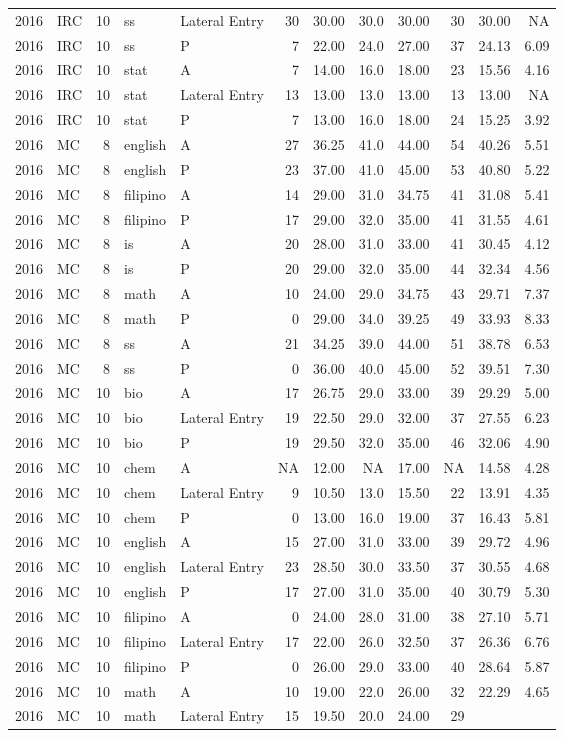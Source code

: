 \documentclass[]{article}
\begin{document}
\begin{longtable}[]{@{}rlrllrrrrrrr@{}}
2016 & IRC & 10 & ss & Lateral Entry & 30 & 30.00 & 30.0 & 30.00 & 30 &
30.00 & NA\tabularnewline
2016 & IRC & 10 & ss & P & 7 & 22.00 & 24.0 & 27.00 & 37 & 24.13 &
6.09\tabularnewline
2016 & IRC & 10 & stat & A & 7 & 14.00 & 16.0 & 18.00 & 23 & 15.56 &
4.16\tabularnewline
2016 & IRC & 10 & stat & Lateral Entry & 13 & 13.00 & 13.0 & 13.00 & 13
& 13.00 & NA\tabularnewline
2016 & IRC & 10 & stat & P & 7 & 13.00 & 16.0 & 18.00 & 24 & 15.25 &
3.92\tabularnewline
2016 & MC & 8 & english & A & 27 & 36.25 & 41.0 & 44.00 & 54 & 40.26 &
5.51\tabularnewline
2016 & MC & 8 & english & P & 23 & 37.00 & 41.0 & 45.00 & 53 & 40.80 &
5.22\tabularnewline
2016 & MC & 8 & filipino & A & 14 & 29.00 & 31.0 & 34.75 & 41 & 31.08 &
5.41\tabularnewline
2016 & MC & 8 & filipino & P & 17 & 29.00 & 32.0 & 35.00 & 41 & 31.55 &
4.61\tabularnewline
2016 & MC & 8 & is & A & 20 & 28.00 & 31.0 & 33.00 & 41 & 30.45 &
4.12\tabularnewline
2016 & MC & 8 & is & P & 20 & 29.00 & 32.0 & 35.00 & 44 & 32.34 &
4.56\tabularnewline
2016 & MC & 8 & math & A & 10 & 24.00 & 29.0 & 34.75 & 43 & 29.71 &
7.37\tabularnewline
2016 & MC & 8 & math & P & 0 & 29.00 & 34.0 & 39.25 & 49 & 33.93 &
8.33\tabularnewline
2016 & MC & 8 & ss & A & 21 & 34.25 & 39.0 & 44.00 & 51 & 38.78 &
6.53\tabularnewline
2016 & MC & 8 & ss & P & 0 & 36.00 & 40.0 & 45.00 & 52 & 39.51 &
7.30\tabularnewline
2016 & MC & 10 & bio & A & 17 & 26.75 & 29.0 & 33.00 & 39 & 29.29 &
5.00\tabularnewline
2016 & MC & 10 & bio & Lateral Entry & 19 & 22.50 & 29.0 & 32.00 & 37 &
27.55 & 6.23\tabularnewline
2016 & MC & 10 & bio & P & 19 & 29.50 & 32.0 & 35.00 & 46 & 32.06 &
4.90\tabularnewline
2016 & MC & 10 & chem & A & NA & 12.00 & NA & 17.00 & NA & 14.58 &
4.28\tabularnewline
2016 & MC & 10 & chem & Lateral Entry & 9 & 10.50 & 13.0 & 15.50 & 22 &
13.91 & 4.35\tabularnewline
2016 & MC & 10 & chem & P & 0 & 13.00 & 16.0 & 19.00 & 37 & 16.43 &
5.81\tabularnewline
2016 & MC & 10 & english & A & 15 & 27.00 & 31.0 & 33.00 & 39 & 29.72 &
4.96\tabularnewline
2016 & MC & 10 & english & Lateral Entry & 23 & 28.50 & 30.0 & 33.50 &
37 & 30.55 & 4.68\tabularnewline
2016 & MC & 10 & english & P & 17 & 27.00 & 31.0 & 35.00 & 40 & 30.79 &
5.30\tabularnewline
2016 & MC & 10 & filipino & A & 0 & 24.00 & 28.0 & 31.00 & 38 & 27.10 &
5.71\tabularnewline
2016 & MC & 10 & filipino & Lateral Entry & 17 & 22.00 & 26.0 & 32.50 &
37 & 26.36 & 6.76\tabularnewline
2016 & MC & 10 & filipino & P & 0 & 26.00 & 29.0 & 33.00 & 40 & 28.64 &
5.87\tabularnewline
2016 & MC & 10 & math & A & 10 & 19.00 & 22.0 & 26.00 & 32 & 22.29 &
4.65\tabularnewline
2016 & MC & 10 & math & Lateral Entry & 15 & 19.50 & 20.0 & 24.00 & 29 &

\end{longtable}
\end{document}
